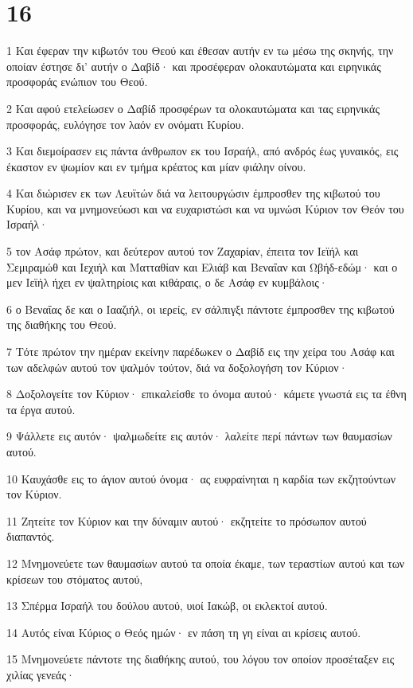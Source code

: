 \chapter{16}

\par 1 Και έφεραν την κιβωτόν του Θεού και έθεσαν αυτήν εν τω μέσω της σκηνής, την οποίαν έστησε δι' αυτήν ο Δαβίδ· και προσέφεραν ολοκαυτώματα και ειρηνικάς προσφοράς ενώπιον του Θεού.
\par 2 Και αφού ετελείωσεν ο Δαβίδ προσφέρων τα ολοκαυτώματα και τας ειρηνικάς προσφοράς, ευλόγησε τον λαόν εν ονόματι Κυρίου.
\par 3 Και διεμοίρασεν εις πάντα άνθρωπον εκ του Ισραήλ, από ανδρός έως γυναικός, εις έκαστον εν ψωμίον και εν τμήμα κρέατος και μίαν φιάλην οίνου.
\par 4 Και διώρισεν εκ των Λευϊτών διά να λειτουργώσιν έμπροσθεν της κιβωτού του Κυρίου, και να μνημονεύωσι και να ευχαριστώσι και να υμνώσι Κύριον τον Θεόν του Ισραήλ·
\par 5 τον Ασάφ πρώτον, και δεύτερον αυτού τον Ζαχαρίαν, έπειτα τον Ιεϊήλ και Σεμιραμώθ και Ιεχιήλ και Ματταθίαν και Ελιάβ και Βεναΐαν και Ωβήδ-εδώμ· και ο μεν Ιεϊήλ ήχει εν ψαλτηρίοις και κιθάραις, ο δε Ασάφ εν κυμβάλοις·
\par 6 ο Βεναΐας δε και ο Ιααζιήλ, οι ιερείς, εν σάλπιγξι πάντοτε έμπροσθεν της κιβωτού της διαθήκης του Θεού.
\par 7 Τότε πρώτον την ημέραν εκείνην παρέδωκεν ο Δαβίδ εις την χείρα του Ασάφ και των αδελφών αυτού τον ψαλμόν τούτον, διά να δοξολογήση τον Κύριον·
\par 8 Δοξολογείτε τον Κύριον· επικαλείσθε το όνομα αυτού· κάμετε γνωστά εις τα έθνη τα έργα αυτού.
\par 9 Ψάλλετε εις αυτόν· ψαλμωδείτε εις αυτόν· λαλείτε περί πάντων των θαυμασίων αυτού.
\par 10 Καυχάσθε εις το άγιον αυτού όνομα· ας ευφραίνηται η καρδία των εκζητούντων τον Κύριον.
\par 11 Ζητείτε τον Κύριον και την δύναμιν αυτού· εκζητείτε το πρόσωπον αυτού διαπαντός.
\par 12 Μνημονεύετε των θαυμασίων αυτού τα οποία έκαμε, των τεραστίων αυτού και των κρίσεων του στόματος αυτού,
\par 13 Σπέρμα Ισραήλ του δούλου αυτού, υιοί Ιακώβ, οι εκλεκτοί αυτού.
\par 14 Αυτός είναι Κύριος ο Θεός ημών· εν πάση τη γη είναι αι κρίσεις αυτού.
\par 15 Μνημονεύετε πάντοτε της διαθήκης αυτού, του λόγου τον οποίον προσέταξεν εις χιλίας γενεάς·
